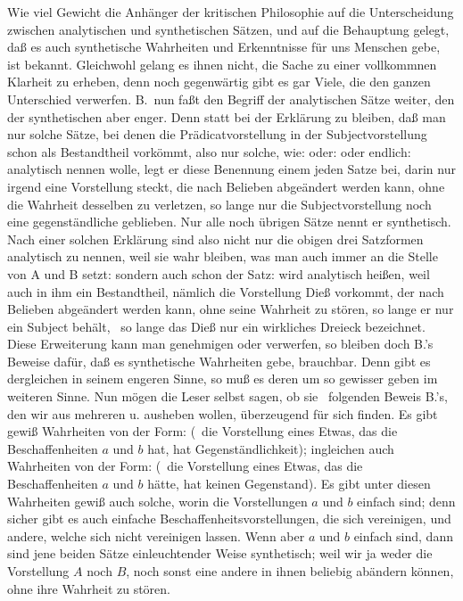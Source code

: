 Wie viel Gewicht die Anhänger der kritischen Philosophie auf die Unterscheidung zwischen analytischen und synthetischen Sätzen, und auf die Behauptung gelegt, daß es auch synthetische Wahrheiten und Erkenntnisse für uns Menschen  gebe, ist bekannt. Gleichwohl gelang es ihnen nicht, die Sache zu einer vollkommnen Klarheit zu erheben, denn noch gegenwärtig gibt es gar Viele, die den ganzen Unterschied verwerfen. B.\ nun faßt  den Begriff der analytischen Sätze weiter, den der synthetischen aber enger. Denn statt bei der Erklärung zu bleiben, daß man nur solche Sätze, bei denen die Prädicatvorstellung in der Subjectvorstellung schon als Bestandtheil vorkömmt, also nur solche, wie:  oder:  oder endlich:  analytisch nennen wolle, legt er diese Benennung einem jeden Satze bei, darin nur irgend eine Vorstellung steckt, die nach Belieben abgeändert werden kann, ohne die Wahrheit desselben zu verletzen, so lange nur die Subjectvorstellung noch eine gegenständliche geblieben. Nur alle noch übrigen Sätze nennt er synthetisch. Nach einer solchen Erklärung sind also nicht nur die obigen drei Satzformen analytisch zu nennen, weil sie wahr bleiben, was man auch immer an die Stelle von A und B setzt: sondern auch schon der Satz:  wird analytisch heißen, weil auch in ihm ein Bestandtheil, nämlich die Vorstellung Dieß vorkommt, der nach Belieben abgeändert werden kann, ohne seine Wahrheit zu stören, so lange er nur ein Subject behält, \dh\  so lange das Dieß nur ein wirkliches Dreieck bezeichnet. Diese Erweiterung kann man genehmigen oder verwerfen, so bleiben doch B.'s Beweise dafür, daß es synthetische Wahrheiten gebe, brauchbar. Denn gibt es dergleichen in seinem engeren Sinne, so muß es deren um so gewisser geben im weiteren Sinne. Nun mögen die Leser selbst sagen, ob sie \zB\ folgenden Beweis B.'s, den wir aus mehreren  u.  ausheben wollen, überzeugend für sich finden. Es gibt gewiß Wahrheiten von der Form:  (\dh\  die Vorstellung eines Etwas, das die Beschaffenheiten $a$ und $b$ hat, hat Gegenständlichkeit); ingleichen auch Wahrheiten von der Form:  (\dh\  die Vorstellung eines Etwas, das die Beschaffenheiten $a$ und $b$ hätte, hat keinen Gegenstand). Es gibt unter diesen Wahrheiten gewiß auch solche, worin die Vorstellungen $a$ und $b$ einfach sind;  denn sicher gibt es auch einfache Beschaffenheitsvorstellungen, die sich vereinigen, und andere, welche sich nicht vereinigen lassen. Wenn aber $a$ und $b$ einfach sind, dann sind jene beiden Sätze einleuchtender Weise synthetisch; weil wir ja weder die Vorstellung $A$ noch $B$, noch sonst eine andere in ihnen beliebig abändern können, ohne ihre Wahrheit zu stören.\par
